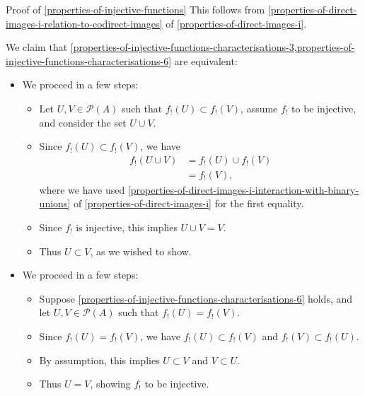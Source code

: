 \begin{Proof}{Proof of \cref{properties-of-injective-functions}}
    This follows from \cref{properties-of-direct-images-i-relation-to-codirect-images} of \cref{properties-of-direct-images-i}.

    We claim that \cref{properties-of-injective-functions-characterisations-3,properties-of-injective-functions-characterisations-6} are equivalent:
    \begin{itemize}
        \item{}We proceed in a few steps:
            \begin{itemize}
                \item Let $U,V\in\mathcal{P}(A)$ such that $f_{!}(U)\subset f_{!}(V)$, assume $f_{!}$ to be injective, and consider the set $U\cup V$.
                \item Since $f_{!}(U)\subset f_{!}(V)$, we have
                    \begin{align*}
                        f_{!}(U\cup V) &= f_{!}(U)\cup f_{!}(V)\\
                                       &= f_{!}(V),
                    \end{align*}
                    where we have used \cref{properties-of-direct-images-i-interaction-with-binary-unions} of \cref{properties-of-direct-images-i} for the first equality.
                \item Since $f_{!}$ is injective, this implies $U\cup V=V$.
                \item Thus $U\subset V$, as we wished to show.
            \end{itemize}
        \item{}We proceed in a few steps:
            \begin{itemize}
                \item Suppose \cref{properties-of-injective-functions-characterisations-6} holds, and let $U,V\in\mathcal{P}(A)$ such that $f_{!}(U)=f_{!}(V)$.
                \item Since $f_{!}(U)=f_{!}(V)$, we have $f_{!}(U)\subset f_{!}(V)$ and $f_{!}(V)\subset f_{!}(U)$.
                \item By assumption, this implies $U\subset V$ and $V\subset U$.
                \item Thus $U=V$, showing $f_{!}$ to be injective.
            \end{itemize}
    \end{itemize}


\end{Proof}
